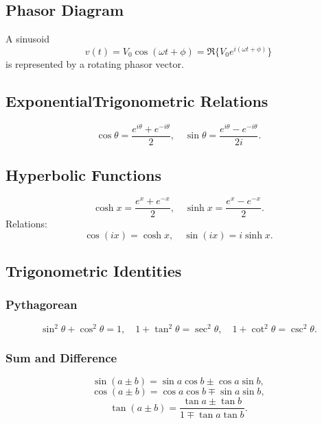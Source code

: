 \documentclass[a4paper,12pt]{article}
\begin{document}
\subsection{Phasor Diagram}
A sinusoid
\[
v(t) = V_0 \cos(\omega t + \phi) = \Re\{V_0 e^{i(\omega t + \phi)}\}
\]
is represented by a rotating phasor vector.

\begin{center}
\end{center}

\subsection{Exponential\-Trigonometric Relations}
\[
\cos\theta = \frac{e^{i\theta} + e^{-i\theta}}{2}, \quad
\sin\theta = \frac{e^{i\theta} - e^{-i\theta}}{2i}.
\]

\subsection{Hyperbolic Functions}
\[
\cosh x = \frac{e^x + e^{-x}}{2}, \quad \sinh x = \frac{e^x - e^{-x}}{2}.
\]
Relations:
\[
\cos(ix) = \cosh x, \quad \sin(ix) = i\sinh x.
\]


\subsection{Trigonometric Identities}

\subsubsection{Pythagorean}
\[
\sin^2\theta + \cos^2\theta = 1, \quad
1 + \tan^2\theta = \sec^2\theta, \quad
1 + \cot^2\theta = \csc^2\theta.
\]

\subsubsection{Sum and Difference}
\[
\sin(a \pm b) = \sin a \cos b \pm \cos a \sin b,
\]
\[
\cos(a \pm b) = \cos a \cos b \mp \sin a \sin b,
\]
\[
\tan(a \pm b) = \frac{\tan a \pm \tan b}{1 \mp \tan a \tan b}.
\]
\end{document}
